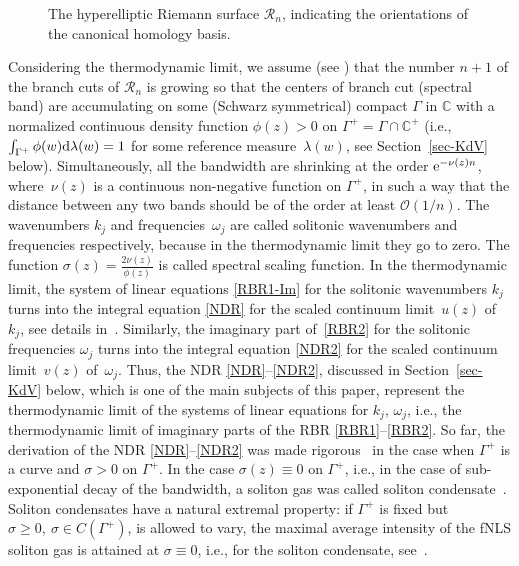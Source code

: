 \documentclass[10pt,a4paper]{amsart}
\numberwithin{equation}{section}
\newcommand{\G}{\Gamma}
\renewcommand{\o}{\omega}
\def\Rscr{\mathcal{R}}
\def\C{{\mathbb C}}
\def\l{\lambda}
\def\s{ {\sigma}}
\def\l{\lambda}
\def\s{\sigma}
\def\o{\omega}
\def\G{\Gamma}
\begin{document}
\begin{figure}[h]
{}

	\caption{The hyperelliptic Riemann surface $\mathcal R_n$, indicating the orientations of the canonical homology basis.  }
	\label{Fig:Cont}
	\vspace{5pt}
\end{figure}


Considering the thermodynamic limit, we assume
(see \cite{ElRew1,ET2020}) that the number $n+1$ of the branch cuts of $\Rscr_n$ is growing so that the centers of branch cut (spectral band) are accumulating on some (Schwarz symmetrical) compact $\G$ in $\C$ with a
normalized continuous density function $\phi(z)>0$ on $\G^+=\G\cap\C^+$ \big(i.e., $\int_{\G^+}\phi(w){\rm d}\l(w)=1$ for some reference measure~$\l(w)$, see Section~\ref{sec-KdV} below\big).
Simultaneously, all the bandwidth are shrinking at the order ${\rm e}^{-\nu(z)n}$, where~$\nu(z)$ is a continuous non-negative function on $\G^+$,
in such a way that the distance between any two bands should be of the order at least $\mathcal{O}(1/n)$. The wavenumbers $k_j$ and frequencies~$\o_j$ are called solitonic wavenumbers and frequencies respectively, because in the thermodynamic limit they go to zero. The function $\s(z)=\frac{ 2\nu(z)}{\phi(z)}$ is called spectral scaling function.
	In
	the thermodynamic limit, the system of linear equations \eqref{RBR1-Im} for the solitonic wavenumbers $k_j$ turns into the integral equation \eqref{NDR} for the scaled continuum limit~$u(z)$ of~$k_j$, see details in~\cite{ET2020}.
	Similarly, the imaginary part of~\eqref{RBR2} for the solitonic frequencies $\o_j$ turns into the integral equation \eqref{NDR2} for the scaled continuum limit~$v(z)$ of~$\o_j$.
	Thus, the NDR
	\eqref{NDR}--\eqref{NDR2}, discussed in Section~\ref{sec-KdV} below, which is one of the main subjects of this paper, represent the thermodynamic limit of the systems of linear equations for $k_j$, $\o_j$, i.e., the thermodynamic limit of imaginary parts of the RBR \eqref{RBR1}--\eqref{RBR2}.
So far, the derivation of the NDR
\eqref{NDR}--\eqref{NDR2} was made rigorous~\cite{TW}
in the case when $\G^+$ is a curve and $\s>0$ on $\G^+$. In the case $\s(z)\equiv 0$ on $\G^+$, i.e., in the case of sub-exponential decay of the bandwidth, a soliton gas was called soliton condensate~\cite{ET2020}. Soliton condensates have a natural extremal property: if $\G^+$ is fixed but $\s\geq 0,~\s\in C(\G^+)$, is allowed to vary, the maximal average intensity of the fNLS soliton gas is attained at $\s\equiv 0$, i.e., for the soliton condensate, see~\cite{KT2021}.
\end{document}

